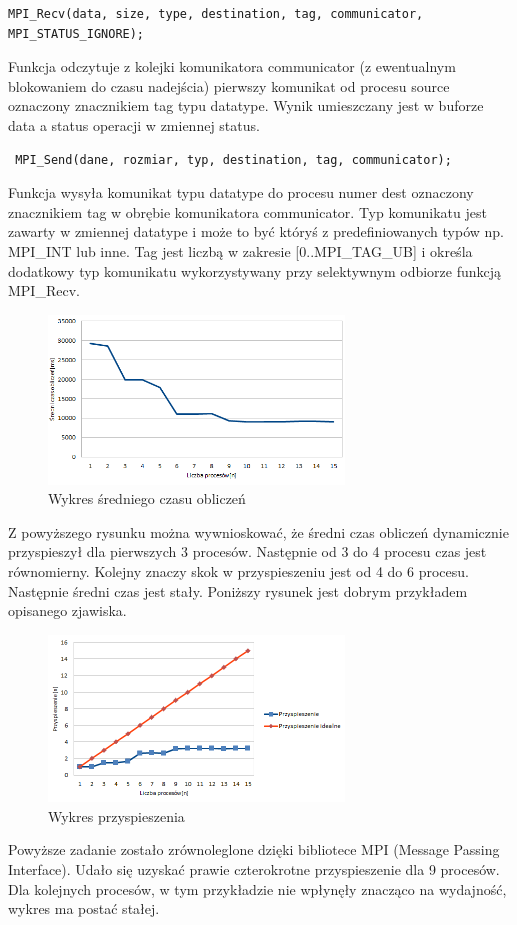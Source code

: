 \documentclass[a4paper,11pt]{article}
\begin{document}
\begin{lstlisting}
MPI_Recv(data, size, type, destination, tag, communicator, MPI_STATUS_IGNORE);
\end{lstlisting}
Funkcja odczytuje z kolejki komunikatora communicator (z ewentualnym blokowaniem do czasu nadejścia) pierwszy komunikat od procesu source oznaczony znacznikiem tag typu datatype. Wynik umieszczany jest w buforze data a status operacji w zmiennej status.

\begin{lstlisting}
 MPI_Send(dane, rozmiar, typ, destination, tag, communicator);
\end{lstlisting}
Funkcja wysyła komunikat typu datatype do procesu numer dest oznaczony znacznikiem tag w obrębie komunikatora communicator.
Typ komunikatu jest zawarty w zmiennej datatype i może to być któryś z predefiniowanych typów np.  MPI\_INT lub inne. Tag jest liczbą w zakresie [0..MPI\_TAG\_UB] i określa dodatkowy typ komunikatu wykorzystywany przy selektywnym odbiorze funkcją MPI\_Recv.


\begin{figure}[!ht]
	\centering
 \includegraphics[width=0.7\textwidth]{1.png}
  \caption{Wykres średniego czasu obliczeń}
\end{figure}

Z powyższego rysunku można wywnioskować, że średni czas obliczeń dynamicznie przyspieszył dla pierwszych 3 procesów. Następnie od 3 do 4 procesu czas jest równomierny. Kolejny znaczy skok w przyspieszeniu jest od 4 do 6 procesu. Następnie średni czas jest stały.
Poniższy rysunek jest dobrym przykładem opisanego zjawiska.

\begin{figure}[ht]
	\centering
  \includegraphics[width=0.7\textwidth]{2.png}
  \caption{Wykres przyspieszenia}
\end{figure}

Powyższe zadanie zostało zrównoleglone dzięki bibliotece MPI (Message Passing Interface). Udało się uzyskać prawie czterokrotne przyspieszenie dla 9 procesów. Dla kolejnych  procesów, w tym przykładzie nie wpłynęły znacząco na wydajność, wykres ma postać stałej.
\end{document}
